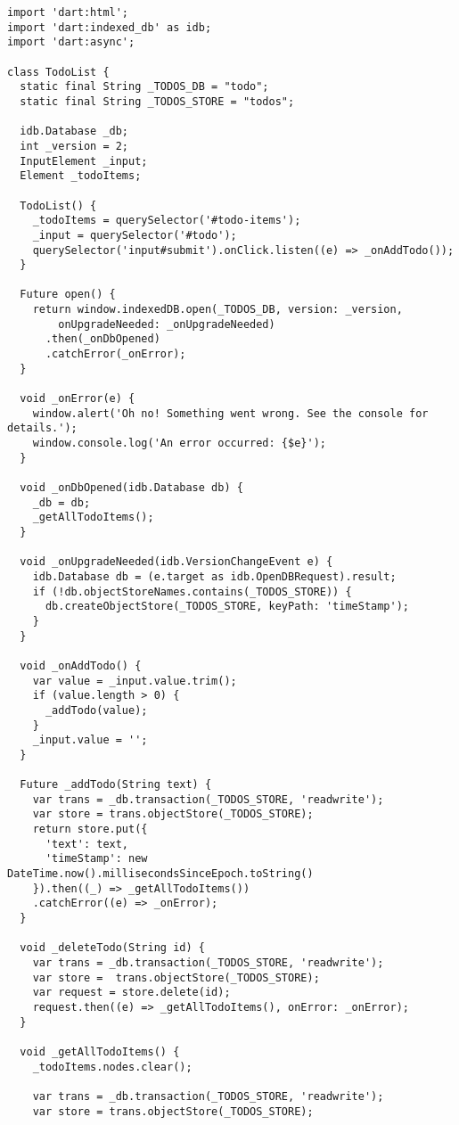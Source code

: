 \begin{lstlisting}[label=dtd,caption=Dart to-do list example]
import 'dart:html';
import 'dart:indexed_db' as idb;
import 'dart:async';

class TodoList {
  static final String _TODOS_DB = "todo";
  static final String _TODOS_STORE = "todos";

  idb.Database _db;
  int _version = 2;
  InputElement _input;
  Element _todoItems;

  TodoList() {
    _todoItems = querySelector('#todo-items');
    _input = querySelector('#todo');
    querySelector('input#submit').onClick.listen((e) => _onAddTodo());
  }

  Future open() {
    return window.indexedDB.open(_TODOS_DB, version: _version,
        onUpgradeNeeded: _onUpgradeNeeded)
      .then(_onDbOpened)
      .catchError(_onError);
  }

  void _onError(e) {
    window.alert('Oh no! Something went wrong. See the console for details.');
    window.console.log('An error occurred: {$e}');
  }

  void _onDbOpened(idb.Database db) {
    _db = db;
    _getAllTodoItems();
  }

  void _onUpgradeNeeded(idb.VersionChangeEvent e) {
    idb.Database db = (e.target as idb.OpenDBRequest).result;
    if (!db.objectStoreNames.contains(_TODOS_STORE)) {
      db.createObjectStore(_TODOS_STORE, keyPath: 'timeStamp');
    }
  }

  void _onAddTodo() {
    var value = _input.value.trim();
    if (value.length > 0) {
      _addTodo(value);
    }
    _input.value = '';
  }

  Future _addTodo(String text) {
    var trans = _db.transaction(_TODOS_STORE, 'readwrite');
    var store = trans.objectStore(_TODOS_STORE);
    return store.put({
      'text': text,
      'timeStamp': new DateTime.now().millisecondsSinceEpoch.toString()
    }).then((_) => _getAllTodoItems())
    .catchError((e) => _onError);
  }

  void _deleteTodo(String id) {
    var trans = _db.transaction(_TODOS_STORE, 'readwrite');
    var store =  trans.objectStore(_TODOS_STORE);
    var request = store.delete(id);
    request.then((e) => _getAllTodoItems(), onError: _onError);
  }

  void _getAllTodoItems() {
    _todoItems.nodes.clear();

    var trans = _db.transaction(_TODOS_STORE, 'readwrite');
    var store = trans.objectStore(_TODOS_STORE);


\end{lstlisting}
